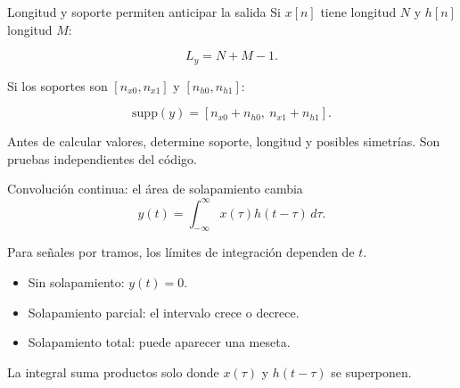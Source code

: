 \documentclass[
  ignorenonframetext,
  aspectratio=169,
  spanish,
  professionalfonts]{beamer}
\providecommand{\tightlist}{%
  \setlength{\itemsep}{0pt}\setlength{\parskip}{0pt}}
\begin{document}
\begin{frame}{Longitud y soporte permiten anticipar la salida}
\protect{}\label{longitud-y-soporte-permiten-anticipar-la-salida}
Si \(x[n]\) tiene longitud \(N\) y \(h[n]\) longitud \(M\):

\[
L_y=N+M-1.
\]

Si los soportes son \([n_{x0},n_{x1}]\) y \([n_{h0},n_{h1}]\):

\[
\mathrm{supp}(y)=[n_{x0}+n_{h0},\ n_{x1}+n_{h1}].
\]

\begin{tcolorbox}[enhanced jigsaw, arc=.35mm, bottomrule=.15mm, bottomtitle=1mm, breakable, colback=white, colbacktitle=quarto-callout-tip-color!10!white, colframe=quarto-callout-tip-color-frame, coltitle=black, left=2mm, leftrule=.75mm, opacityback=0, opacitybacktitle=0.6, rightrule=.15mm, title={Control de errores}, titlerule=0mm, toprule=.15mm, toptitle=1mm]

Antes de calcular valores, determine soporte, longitud y posibles
simetrías. Son pruebas independientes del código.

\end{tcolorbox}
\end{frame}

\begin{frame}{Convolución continua: el área de solapamiento cambia}
\protect{}\label{convoluciuxf3n-continua-el-uxe1rea-de-solapamiento-cambia}
\[
y(t)=\int_{-\infty}^{\infty}x(\tau)h(t-\tau)\,d\tau.
\]

Para señales por tramos, los límites de integración dependen de \(t\).

\begin{itemize}
\tightlist
\item
  Sin solapamiento: \(y(t)=0\).
\item
  Solapamiento parcial: el intervalo crece o decrece.
\item
  Solapamiento total: puede aparecer una meseta.
\end{itemize}

\begin{tcolorbox}[enhanced jigsaw, arc=.35mm, bottomrule=.15mm, bottomtitle=1mm, breakable, colback=white, colbacktitle=quarto-callout-important-color!10!white, colframe=quarto-callout-important-color-frame, coltitle=black, left=2mm, leftrule=.75mm, opacityback=0, opacitybacktitle=0.6, rightrule=.15mm, title={Interpretación geométrica}, titlerule=0mm, toprule=.15mm, toptitle=1mm]

La integral suma productos solo donde \(x(\tau)\) y \(h(t-\tau)\) se
superponen.

\end{tcolorbox}
\end{frame}
\end{document}
